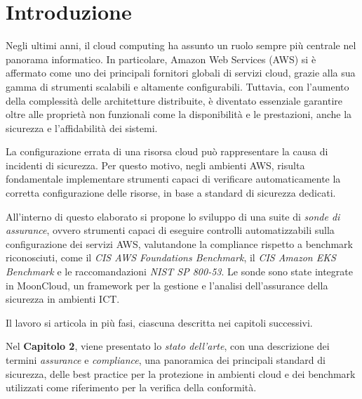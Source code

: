 
\chapter{Introduzione}
\label{cap:introduzione}

Negli ultimi anni, il cloud computing ha assunto un ruolo sempre più centrale nel panorama informatico. In particolare, Amazon Web Services (AWS) si è affermato come uno dei principali fornitori globali di servizi cloud, grazie alla sua gamma di strumenti scalabili e altamente configurabili. Tuttavia, con l'aumento della complessità delle architetture distribuite, è diventato essenziale garantire oltre alle proprietà non funzionali come la disponibilità e le prestazioni, anche la sicurezza e l'affidabilità dei sistemi. 

La configurazione errata di una risorsa cloud può rappresentare la causa di incidenti di sicurezza. Per questo motivo, negli ambienti AWS, risulta fondamentale implementare strumenti capaci di verificare automaticamente la corretta configurazione delle risorse, in base a standard di sicurezza dedicati.

All'interno di questo elaborato si propone lo sviluppo di una suite di \emph{sonde di assurance}, ovvero strumenti capaci di eseguire controlli automatizzabili sulla configurazione dei servizi AWS, valutandone la compliance rispetto a benchmark riconosciuti, come il \emph{CIS AWS Foundations Benchmark}, il \emph{CIS Amazon EKS Benchmark} e le raccomandazioni \emph{NIST SP 800-53}. Le sonde sono state integrate in MoonCloud, un framework per la gestione e l'analisi dell'assurance della sicurezza in ambienti ICT.

Il lavoro si articola in più fasi, ciascuna descritta nei capitoli successivi.

Nel \textbf{Capitolo 2}, viene presentato lo \textit{stato dell'arte}, con una descrizione dei termini \emph{assurance} e \emph{compliance}, una panoramica dei principali standard di sicurezza, delle best practice per la protezione in ambienti cloud e dei benchmark utilizzati come riferimento per la verifica della conformità.

